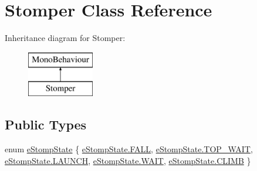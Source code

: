 \hypertarget{class_stomper}{}\section{Stomper Class Reference}
\label{class_stomper}


 


Inheritance diagram for Stomper\+:\begin{figure}[H]
\begin{center}
\leavevmode
\includegraphics[height=2.000000cm]{class_stomper}
\end{center}
\end{figure}
\subsection*{Public Types}
\begin{DoxyCompactItemize}
\item 
enum \mbox{\hyperlink{class_stomper_aae04e54d13bcee7c7b32dbea23aebcb3}{e\+Stomp\+State}} \{ \newline
\mbox{\hyperlink{class_stomper_aae04e54d13bcee7c7b32dbea23aebcb3a479ab1b75080105c17b10096543dc8c5}{e\+Stomp\+State.\+F\+A\+LL}}, 
\mbox{\hyperlink{class_stomper_aae04e54d13bcee7c7b32dbea23aebcb3a691340ccb1f6550c9bdda6a1466b5537}{e\+Stomp\+State.\+T\+O\+P\+\_\+\+W\+A\+IT}}, 
\mbox{\hyperlink{class_stomper_aae04e54d13bcee7c7b32dbea23aebcb3a49c08d83927c163a001f9a8908c2fa03}{e\+Stomp\+State.\+L\+A\+U\+N\+CH}}, 
\mbox{\hyperlink{class_stomper_aae04e54d13bcee7c7b32dbea23aebcb3ad5cc6a0064b5c25ba37826aa3fda910c}{e\+Stomp\+State.\+W\+A\+IT}}, 
\newline
\mbox{\hyperlink{class_stomper_aae04e54d13bcee7c7b32dbea23aebcb3a31c1814360e4e67f1adf1d03aa1c47e1}{e\+Stomp\+State.\+C\+L\+I\+MB}}
 \}
\end{DoxyCompactItemize}

